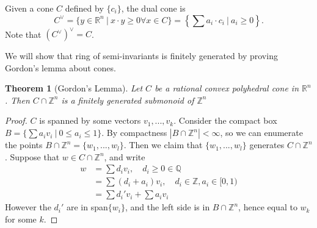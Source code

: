 \documentclass{article}
\newtheorem{theorem}{Theorem}
\theoremstyle{definition}
\theoremstyle{remark}
\numberwithin{theorem}{section}
\newenvironment{thm}{
\begin{mdframed}
	\vspace{-0.5em}
	\begin{theorem}
}{
	\end{theorem}
\end{mdframed}
}
\begin{document}
	Given a cone $C$ defined by $\{c_i\}$, the dual cone is
	$$C^\vee = \{y\in\mathbb{R}^n ~|~ x\cdot y \geq 0 \forall x\in C\} = \left\{ \sum a_i\cdot c_i ~|~ a_i\geq 0 \right\}.$$
	Note that $(C^\vee)^\vee = C$. \vspace{1em}
	
	We will show that ring of semi-invariants is finitely generated by proving Gordon's lemma about cones.
	\begin{thm}[Gordon's Lemma]
		Let $C$ be a rational convex polyhedral cone in $\mathbb{R}^n$. Then $C\cap \mathbb{Z}^n$ is a finitely generated submonoid of $\mathbb{Z}^n$
	\end{thm}
	\begin{proof}
		$C$ is spanned by some vectors $v_1,...,v_k$. Consider the compact box $B=\{\sum a_i v_i ~|~ 0\leq a_i \leq 1\}.$ By compactness $|B\cap \mathbb{Z}^n| < \infty$, so we can enumerate the points $B\cap \mathbb{Z}^n = \{w_1,...,w_l\}$. Then we claim that $\{w_1,...,w_l\}$ generates $C\cap \mathbb{Z}^n$. Suppose that $w\in C\cap \mathbb{Z}^n$, and write
		\begin{align*}
			w &= \sum d_i v_i, \quad d_i \geq 0 \in \mathbb{Q}\\
			&= \sum(d_i + a_i)v_i, \quad d_i\in\mathbb{Z}, a_i\in [0,1)\\
			&= \sum d_i'v_i + \sum a_i v_i
		\end{align*}
		However the $d_i'$ are in span$\{w_i\}$, and the left side is in $B\cap \mathbb{Z}^n$, hence equal to $w_k$ for some $k$.
	\end{proof}
\end{document}
